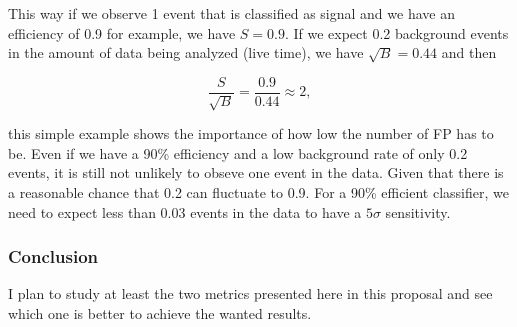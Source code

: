 This way if we observe 1 event that is classified as signal and we have an efficiency of 0.9 for example, we have $S = 0.9$. If we expect 0.2 background events in the amount of data being analyzed (live time), we have $\sqrt{B} = 0.44$ and then

$$\frac{S}{\sqrt{B}} = \frac{0.9}{0.44} \approx 2,$$

this simple example shows the importance of how low the number of FP has to be. Even if we have a 90\% efficiency and a low background rate of only 0.2 events, it is still not unlikely to obseve one event in the data. Given that there is a reasonable chance that 0.2 can fluctuate to 0.9. For a 90\% efficient classifier, we need to expect less than 0.03 events in the data to have a $5\sigma$ sensitivity.

\subsubsection{Conclusion} \label{Conclusion}

I plan to study at least the two metrics presented here in this proposal and see which one is better to achieve the wanted results.






